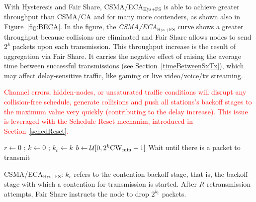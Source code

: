 	With Hysteresis and Fair Share, CSMA/ECA$_{\text{Hys+FS}}$ is able to achieve greater throughput than CSMA/CA and for many more contenders, as shown also in Figure~\ref{fig:BECA}. In the figure, the \emph{CSMA/ECA$_{\text{Hys+FS}}$} curve shows a greater throughput because collisions are eliminated and Fair Share allows nodes to send $2^{k}$ packets upon each transmission. This throughput increase is the result of aggregation via Fair Share. It carries the negative effect of raising the average time between successful transmissions (see Section~\ref{timeBetweenSxTx}), which may affect delay-sensitive traffic, like gaming or live video/voice/tv streaming. 
	
	\textcolor{red}{Channel errors, hidden-nodes, or unsaturated traffic conditions will disrupt any collision-free schedule, generate collisions and push all stations's backoff stages to the maximum value very quickly (contributing to the delay increase). This issue is leveraged with the Schedule Reset mechanim, introduced in Section~\ref{schedReset}.}

	\begin{algorithm}[tb]
	{
	  $r \leftarrow 0$ ; $k \leftarrow 0$ ; $k_{c} \leftarrow k$\label{emptyQueue}\;
	  $b \leftarrow \mathcal{U}[0,2^k\rm{CW}_{min}-1]$\;
	  Wait until there is a packet to transmit\;
	}	
	\vspace{0.2cm}
	\caption{CSMA/ECA$_{\text{Hys+FS}}$: $k_{c}$ refers to the contention backoff stage, that is, the backoff stage with which a contention for transmission is started. After $R$ retransmission attempts, Fair Share instructs the node to drop $2^{k_{c}}$ packets.}
	\label{alg:fullECA}
	\end{algorithm}
	
